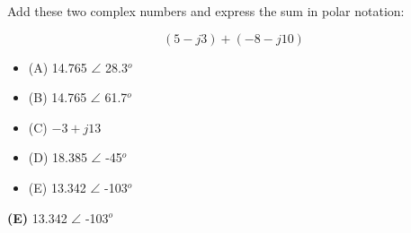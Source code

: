 

Add these two complex numbers and express the sum in polar notation:

$$(5 - j3) + (-8 - j10)$$

\begin{itemize}
\item{(A)} 14.765 $\angle$ 28.3$^{o}$
\vskip 5pt 
\item{(B)} 14.765 $\angle$ 61.7$^{o}$
\vskip 5pt 
\item{(C)} $-3 + j13$
\vskip 5pt 
\item{(D)} 18.385 $\angle$ -45$^{o}$
\vskip 5pt 
\item{(E)} 13.342 $\angle$ -103$^{o}$
\end{itemize}







{\bf (E)} 13.342 $\angle$ -103$^{o}$
 










